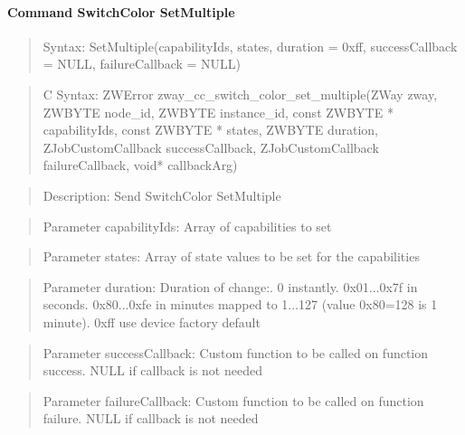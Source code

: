 \paragraph{Command SwitchColor SetMultiple}
\begin{quote}Syntax: SetMultiple(capabilityIds, states, duration = 0xff, successCallback = NULL, failureCallback = NULL)\end{quote}
\begin{quote}C Syntax: ZWError zway\_cc\_switch\_color\_set\_multiple(ZWay zway, ZWBYTE node\_id, ZWBYTE instance\_id, const ZWBYTE * capabilityIds, const ZWBYTE * states, ZWBYTE duration, ZJobCustomCallback successCallback, ZJobCustomCallback failureCallback, void* callbackArg)\end{quote}
\begin{quote}Description: Send SwitchColor SetMultiple\end{quote}
\begin{quote}Parameter capabilityIds: Array of capabilities to set\end{quote}
\begin{quote}Parameter states: Array of state values to be set for the capabilities\end{quote}
\begin{quote}Parameter duration: Duration of change:. 0 instantly. 0x01...0x7f in seconds. 0x80...0xfe in minutes mapped to 1...127 (value 0x80=128 is 1 minute). 0xff use device factory default\end{quote}
\begin{quote}Parameter successCallback: Custom function to be called on function success. NULL if callback is not needed\end{quote}
\begin{quote}Parameter failureCallback: Custom function to be called on function failure. NULL if callback is not needed\end{quote}


